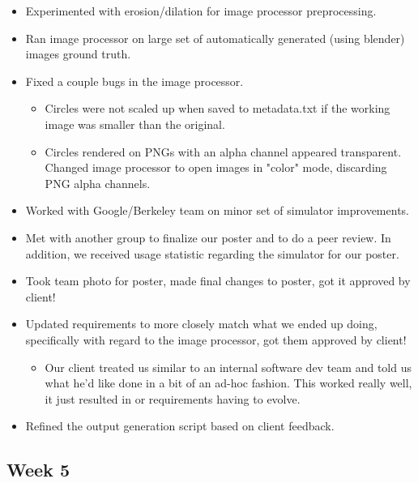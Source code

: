 \documentclass[10pt, onecolumn, draftclsnofoot, letterpaper, compsoc]{IEEEtran}
\begin{document}
    \begin{itemize}

	\item Experimented with erosion/dilation for image processor preprocessing.

	\item Ran image processor on large set of automatically generated (using blender) images ground truth.

	\item Fixed a couple bugs in the image processor.

	\begin{itemize}
		\item Circles were not scaled up when saved to metadata.txt if the working image was smaller than the original.
		\item Circles rendered on PNGs with an alpha channel appeared transparent. Changed image processor to open images in "color" mode, discarding PNG alpha channels.
	\end{itemize}

	\item Worked with Google/Berkeley team on minor set of simulator improvements.

	\item Met with another group to finalize our poster and to do a peer review. In addition, we received usage statistic regarding the simulator for our poster.

	\item Took team photo for poster, made final changes to poster, got it approved by client!

	\item Updated requirements to more closely match what we ended up doing, specifically with regard to the image processor, got them approved by client!

	\begin{itemize}
		\item Our client treated us similar to an internal software dev team and told us what he'd like done in a bit of an ad-hoc fashion. This worked really well, it just resulted in or requirements having to evolve.
	\end{itemize}

	\item Refined the output generation script based on client feedback.

    \end{itemize}

\subsection{Week 5}
\end{document}

